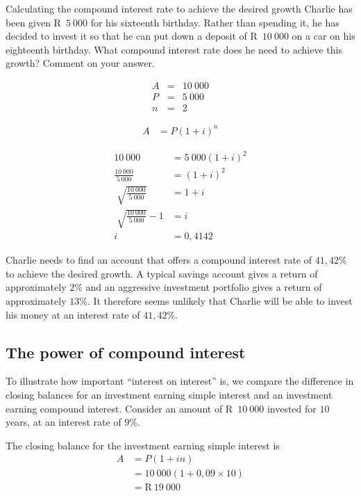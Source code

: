 \begin{wex}{Calculating the compound interest rate to achieve the
    desired growth}
{Charlie has been given R~$5~000$ for his sixteenth birthday. Rather
  than spending it, he has decided to invest it so that he can put
  down a deposit of R~$10~000$ on a car on his eighteenth
  birthday. What compound interest rate does he need to achieve this
  growth? Comment on your answer.}
{
    \begin{eqnarray*}
	A &=& 10~000\\
	P &=& 5~000\\
	n &=& 2
    \end{eqnarray*}

    \begin{align*}
	A &= P(1 + i)^n
    \end{align*}

    \begin{align*}
	10~000 &= 5~000(1 + i)^2\\
	\frac{10~000}{5~000}&= (1 +i)^2\\[5pt]
	\sqrt[]{\frac{10~000}{5~000}} &= 1 + i\\[5pt]
	\sqrt[]{\frac{10~000}{5~000}} - 1 &= i\\
	i &= 0,4142
    \end{align*}

    Charlie needs to find an account that offers a compound interest
    rate of $41,42\%$ to achieve the desired growth.  A typical
    savings account gives a return of approximately $2\%$ and an
    aggressive investment portfolio gives a return of approximately
    $13\%$. It therefore seems unlikely that Charlie will be able to
    invest his money at an interest rate of $41,42\%$.
}
\end{wex}


\subsection{The power of compound interest}

To illustrate how important ``interest on interest'' is, we compare the difference in closing balances for an investment earning simple interest and an investment earning compound interest. Consider an amount of R~$10~000$ invested for $10$ years, at an interest rate of $9\%$.

The closing balance for the investment earning simple interest is
\begin{align*}
    A &= P(1 + in)\\
      &= 10~000(1 + 0,09 \times 10)\\
      &= \mbox{R}~19~000\\
\end{align*}

